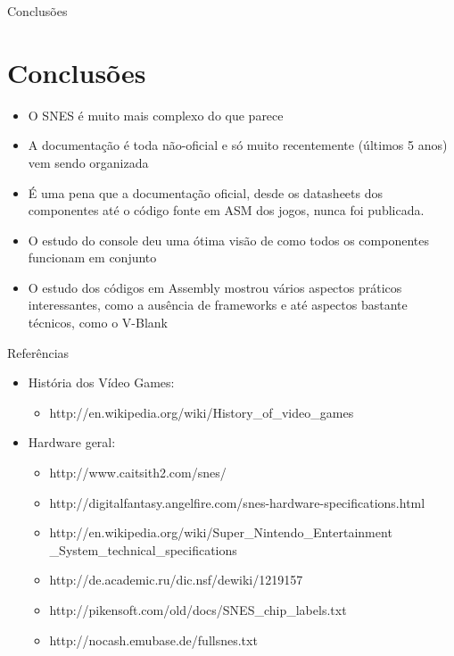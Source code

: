 \documentclass[xcolor=svgnames,handout]{beamer}
\begin{document}
\begin{frame}{Conclusões}
\section{Conclusões}
\begin{itemize}
  \item{O SNES é muito mais complexo do que parece}
  \item{A documentação é toda não-oficial e só muito recentemente (últimos 5 anos) vem sendo organizada}
  \item{É uma pena que a documentação oficial, desde os datasheets dos componentes até o código fonte em ASM dos jogos, nunca foi publicada.}
  \item{O estudo do console deu uma ótima visão de como todos os componentes funcionam em conjunto}
  \item{O estudo dos códigos em Assembly mostrou vários aspectos práticos interessantes, como a ausência de frameworks e até aspectos bastante técnicos, como o V-Blank}
\end{itemize}

\end{frame}

\begin{frame}{Referências}
\begin{itemize}
\item História dos Vídeo Games:
\begin{itemize}	
\item http://en.wikipedia.org/wiki/History\_of\_video\_games
\end{itemize}
\item Hardware geral:
\begin{itemize}	
\item 	http://www.caitsith2.com/snes/
\item 	http://digitalfantasy.angelfire.com/snes-hardware-specifications.html
\item 	http://en.wikipedia.org/wiki/Super\_Nintendo\_Entertainment\\\_System\_technical\_specifications
\item 	http://de.academic.ru/dic.nsf/dewiki/1219157
\item 	http://pikensoft.com/old/docs/SNES\_chip\_labels.txt
\item 	http://nocash.emubase.de/fullsnes.txt
\end{itemize}
\end{itemize}
\end{frame}
\end{document}
